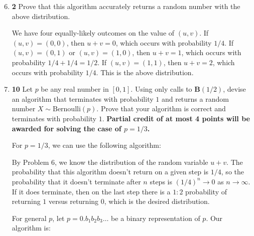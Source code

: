 \documentclass[12pt]{article}
\theoremstyle{plain}
\theoremstyle{definition}
\theoremstyle{remark}
\newcommand{\pts}[1]{\lbrack\textbf{#1}\rbrack}
\begin{document}
\begin{enumerate}
\setcounter{enumi}{5}

\item \pts{2} Prove that this algorithm accurately returns a random number with the above distribution.

\begin{tcolorbox}
We have four equally-likely outcomes on the value of $(u,v)$. If $(u,v)=(0,0)$, then $u+v=0$, which occurs with probability $1/4$. If $(u,v)=(0,1)$ or $(u,v)=(1,0)$, then $u+v=1$, which occurs with probability $1/4+1/4=1/2$. If $(u,v)=(1,1)$, then $u+v=2$, which occurs with probability $1/4$. This is the above distribution.
\end{tcolorbox}

\item \pts{10} Let $p$ be any real number in $[0,1]$. Using only calls to $\textbf{B}(1/2)$, devise an algorithm that terminates with probability $1$ and returns a random number $X\sim\text{Bernoulli}(p)$. Prove that your algorithm is correct and terminates with probability $1$. \textbf{Partial credit of at most 4 points will be awarded for solving the case of $p=1/3$.}

\begin{tcolorbox}
For $p=1/3$, we can use the following algorithm:

\begin{algorithm}[H]
\DontPrintSemicolon
{}
\end{algorithm}

By Problem 6, we know the distribution of the random variable $u+v$. The probability that this algorithm doesn't return on a given step is $1/4$, so the probability that it doesn't terminate after $n$ steps is $(1/4)^n\to0$ as $n\to\infty$. If it does terminate, then on the last step there is a $1:2$ probability of returning $1$ versus returning $0$, which is the desired distribution.
\end{tcolorbox}

\begin{tcolorbox}
For general $p$, let $p=0.b_1b_2b_3\dots$ be a binary representation of $p$. Our algorithm is:

\begin{algorithm}[H]
\DontPrintSemicolon
{}
\end{algorithm}


\end{tcolorbox}
\end{enumerate}
\end{document}
